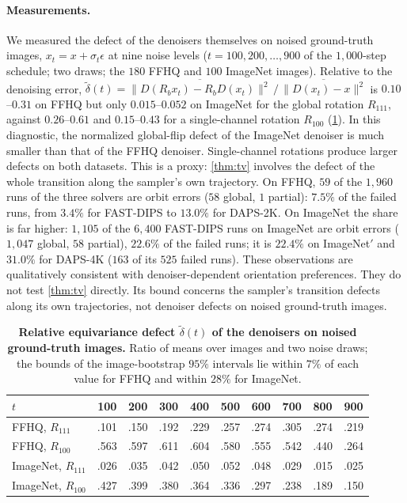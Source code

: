 \paragraph{Measurements.}
We measured the defect of the denoisers themselves on noised ground-truth images, $x_t=x+\sigma_t\epsilon$ at nine noise levels ($t=100,200,\dots,900$ of the $1{,}000$-step schedule; two draws; the $180$ FFHQ and $100$ ImageNet images).
Relative to the denoising error, $\tilde\delta(t)=\overline{\|D(R_bx_t)-R_bD(x_t)\|^2}\,/\,\overline{\|D(x_t)-x\|^2}$ is $0.10$--$0.31$ on FFHQ but only $0.015$--$0.052$ on ImageNet for the global rotation $R_{111}$, against $0.26$--$0.61$ and $0.15$--$0.43$ for a single-channel rotation $R_{100}$ (\cref{tab:s2-c2}).
In this diagnostic, the normalized global-flip defect of the ImageNet denoiser is much smaller than that of the FFHQ denoiser.
Single-channel rotations produce larger defects on both datasets.
This is a proxy: \cref{thm:tv} involves the defect of the whole transition along the sampler's own trajectory.
On FFHQ, $59$ of the $1{,}960$ runs of the three solvers are orbit errors ($58$ global, $1$ partial): $7.5\%$ of the failed runs, from $3.4\%$ for FAST-DIPS to $13.0\%$ for DAPS-2K.
On ImageNet the share is far higher: $1{,}105$ of the $6{,}400$ FAST-DIPS runs on ImageNet are orbit errors ($1{,}047$ global, $58$ partial), $22.6\%$ of the failed runs; it is $22.4\%$ on ImageNet$'$ and $31.0\%$ for DAPS-4K ($163$ of its $525$ failed runs).
These observations are qualitatively consistent with denoiser-dependent orientation preferences.
They do not test \cref{thm:tv} directly.
Its bound concerns the sampler's transition defects along its own trajectories, not denoiser defects on noised ground-truth images.

\begin{table}[h]
\centering\small
\setlength{\tabcolsep}{4pt}
\begin{tabular}{@{}lccccccccc@{}}
\toprule
$t$ & 100 & 200 & 300 & 400 & 500 & 600 & 700 & 800 & 900 \\
\midrule
FFHQ, $R_{111}$ & .101 & .150 & .192 & .229 & .257 & .274 & .305 & .274 & .219 \\
FFHQ, $R_{100}$ & .563 & .597 & .611 & .604 & .580 & .555 & .542 & .440 & .264 \\
ImageNet, $R_{111}$ & .026 & .035 & .042 & .050 & .052 & .048 & .029 & .015 & .025 \\
ImageNet, $R_{100}$ & .427 & .399 & .380 & .364 & .336 & .297 & .238 & .189 & .150 \\
\bottomrule
\end{tabular}
\caption{\textbf{Relative equivariance defect $\tilde\delta(t)$ of the denoisers on noised ground-truth images.} Ratio of means over images and two noise draws; the bounds of the image-bootstrap $95\%$ intervals lie within $7\%$ of each value for FFHQ and within $28\%$ for ImageNet.}
\label{tab:s2-c2}
\end{table}

